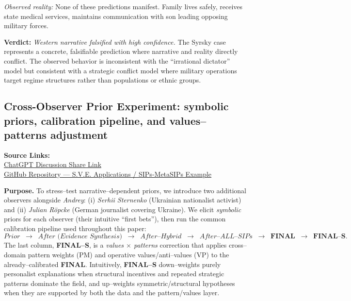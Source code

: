\documentclass[11pt,a4paper]{article}
\begin{document}
\textit{Observed reality:} None of these predictions manifest. Family lives safely, receives state medical services, maintains communication with son leading opposing military forces.

\textbf{Verdict:} \textit{Western narrative falsified with high confidence.} The Syrsky case represents a concrete, falsifiable prediction where narrative and reality directly conflict. The observed behavior is inconsistent with the ``irrational dictator'' model but consistent with a strategic conflict model where military operations target regime structures rather than populations or ethnic groups.

\subsection{Cross-Observer Prior Experiment: symbolic priors, calibration pipeline, and values–patterns adjustment}

\begin{center}
\textbf{Source Links:}\\[4pt]
\href{https://chatgpt.com/share/68f622cb-7b14-8003-91ee-b478d49078f7}{ChatGPT Discussion Share Link}\\
\href{https://codeberg.org/skovnats/SVE-Systemic-Verification-Engineering/tree/master/Applications/SIPs-MetaSIPs/example}{GitHub Repository — S.V.E. Applications / SIPs-MetaSIPs Example}
\end{center}


\noindent\textbf{Purpose.} To stress–test narrative–dependent priors, we introduce two additional observers alongside \emph{Andrey}: (i) \emph{Serhii Sternenko} (Ukrainian nationalist activist) and (ii) \emph{Julian Röpcke} (German journalist covering Ukraine). We elicit \emph{symbolic} priors for each observer (their intuitive “first bets”), then run the common calibration pipeline used throughout this paper:
\[
\textit{Prior} \;\;\rightarrow\;\; \textit{After (Evidence Synthesis)} \;\;\rightarrow\;\; \textit{After–Hybrid} \;\;\rightarrow\;\; \textit{After–ALL–SIPs} \;\;\rightarrow\;\; \textbf{FINAL} \;\;\rightarrow\;\; \textbf{FINAL–S}.
\]
The last column, \textbf{FINAL–S}, is a \emph{values $\times$ patterns} correction that applies cross–domain pattern weights (PM) and operative values/anti–values (VP) to the already–calibrated \textbf{FINAL}. Intuitively, \textbf{FINAL–S} down–weights purely personalist explanations when structural incentives and repeated strategic patterns dominate the field, and up–weights symmetric/structural hypotheses when they are supported by both the data and the pattern/values layer.
\end{document}

